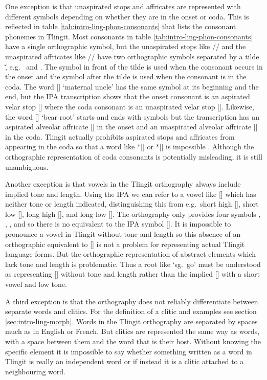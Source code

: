One exception is that unaspirated stops and affricates are represented with different symbols depending on whether they are in the onset or coda.
This is reflected in table \ref{tab:intro-ling-phon-consonants} that lists the consonant phonemes in Tlingit.
Most consonants in table \ref{tab:intro-ling-phon-consonants} have a single orthographic symbol, but the unaspirated stops like // and the unaspirated affricates like // have two orthographic symbols separated by a tilde \~, e.g.\  and .
The symbol in front of the tilde is used when the consonant occurs in the onset and the symbol after the tilde is used when the consonant is in the coda.
The word  [] ‘maternal uncle’ has the same symbol  at its beginning and the end, but the IPA transcription shows that the onset consonant is an aspirated velar stop [] where the coda consonant is an unaspirated velar stop [].
Likewise, the word  [] ‘bear root’ starts and ends with  symbols but the transcription has an aspirated alveolar affricate [] in the onset and an unaspirated alveolar affricate [] in the coda. Tlingit actually prohibits aspirated stops and affricates from appearing in the coda so that a word like *[] or *[] is impossible \parencite{maddieson:2001}.
Although the orthographic representation of coda consonants is potentially misleading, it is still unambiguous.

Another exception is that vowels in the Tlingit orthography always include implied tone and length.
Using the IPA we can refer to a vowel like [] which has neither tone or length indicated, distinguishing this from e.g.\ short high [], short low [], long high [], and long low [].
The orthography only provides four symbols , , , and  so there is no equivalent to the IPA symbol [].
It is impossible to pronounce a vowel in Tlingit without tone and length so this absence of an orthographic equivalent to [] is not a problem for representing actual Tlingit language forms.
But the orthographic representation of abstract elements which lack tone and length is problematic.
Thus a root like  ‘sg.\ go’ must be understood as representing [] without tone and length rather than the implied [] with a short vowel and low tone.

A third exception is that the orthography does not reliably differentiate between separate words and clitics.
For the definition of a clitic and examples see section \ref{sec:intro-ling-morph}.
Words in the Tlingit orthography are separated by spaces much as in English or French.
But clitics are represented the same way as words, with a space between them and the word that is their host.
Without knowing the specific element it is impossible to say whether something written as a word in Tlingit is really an independent word or if instead it is a clitic attached to a neighbouring word.

